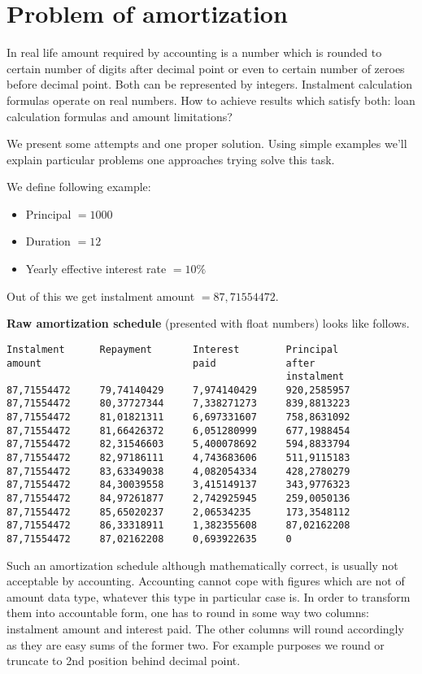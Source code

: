 \documentclass[letterpaper,11pt]{article}
\begin{document}
\section {Problem of amortization}
In real life amount required by accounting is a number which is rounded to certain number of digits after decimal point or even to certain number of zeroes before decimal point. Both can be represented by integers.
Instalment calculation formulas operate on real numbers. How to achieve results which satisfy both: loan calculation formulas and amount limitations?

We present some attempts and one proper solution. Using simple examples we'll explain particular problems one approaches trying solve this task.

We define following example:
\begin{itemize}
\item Principal $= 1000$
\item Duration $= 12$
\item Yearly effective interest rate $= 10\%$
\end{itemize}
Out of this we get instalment amount $= 87,71554472$.

{\bf Raw amortization schedule} (presented with float numbers) looks like follows.

\begin{verbatim}
Instalment      Repayment       Interest        Principal
amount                          paid            after
                                                instalment
87,71554472     79,74140429     7,974140429     920,2585957
87,71554472     80,37727344     7,338271273     839,8813223
87,71554472     81,01821311     6,697331607     758,8631092
87,71554472     81,66426372     6,051280999     677,1988454
87,71554472     82,31546603     5,400078692     594,8833794
87,71554472     82,97186111     4,743683606     511,9115183
87,71554472     83,63349038     4,082054334     428,2780279
87,71554472     84,30039558     3,415149137     343,9776323
87,71554472     84,97261877     2,742925945     259,0050136
87,71554472     85,65020237     2,06534235      173,3548112
87,71554472     86,33318911     1,382355608     87,02162208
87,71554472     87,02162208     0,693922635     0
\end{verbatim}

Such an amortization schedule although mathematically correct, is usually not acceptable by accounting. Accounting cannot cope with figures which are not of amount data type, whatever this type in particular case is. In order to transform them  into accountable form, one has to round in some way two columns: instalment amount and interest paid. The other columns will round accordingly as they are easy sums of the former two. For example purposes we round or truncate to 2nd position behind decimal point.
\end{document}
